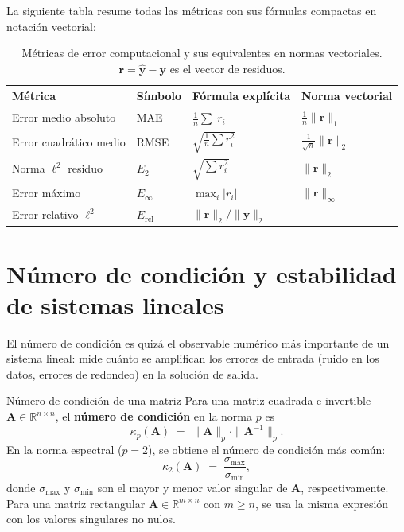 La siguiente tabla resume todas las métricas con sus fórmulas compactas en
notación vectorial:

\begin{table}[htbp]
\centering
\caption{Métricas de error computacional y sus equivalentes en normas vectoriales.
  $\mathbf{r} = \hat{\mathbf{y}} - \mathbf{y}$ es el vector de residuos.}
\label{tab:metricas}
\begin{tabular}{llll}
  \toprule
  \textbf{Métrica} & \textbf{Símbolo} & \textbf{Fórmula explícita}
    & \textbf{Norma vectorial} \\
  \midrule
  Error medio absoluto      & MAE        & $\tfrac{1}{n}\sum|r_i|$
    & $\tfrac{1}{n}\|\mathbf{r}\|_1$ \\[4pt]
  Error cuadrático medio    & RMSE       & $\sqrt{\tfrac{1}{n}\sum r_i^2}$
    & $\tfrac{1}{\sqrt{n}}\|\mathbf{r}\|_2$ \\[4pt]
  Norma $\ell^2$ residuo    & $E_2$      & $\sqrt{\sum r_i^2}$
    & $\|\mathbf{r}\|_2$ \\[4pt]
  Error máximo              & $E_\infty$ & $\max_i|r_i|$
    & $\|\mathbf{r}\|_\infty$ \\[4pt]
  Error relativo $\ell^2$   & $E_{\mathrm{rel}}$ &
    $\|\mathbf{r}\|_2 / \|\mathbf{y}\|_2$ & --- \\
  \bottomrule
\end{tabular}
\end{table}

\FloatBarrier

\section{Número de condición y estabilidad de sistemas lineales}
\label{ap:condicion}

El número de condición es quizá el observable numérico más importante de
un sistema lineal: mide cuánto se amplifican los errores de entrada (ruido
en los datos, errores de redondeo) en la solución de salida.

\begin{definicion}{Número de condición de una matriz}
\label{def:numero_condicion}
Para una matriz cuadrada e invertible $\mathbf{A} \in \mathbb{R}^{n \times n}$,
el \textbf{número de condición} en la norma $p$ es
\[
  \kappa_p(\mathbf{A}) \;=\; \|\mathbf{A}\|_p \cdot \|\mathbf{A}^{-1}\|_p.
\]
En la norma espectral ($p=2$), se obtiene el número de condición más común:
\[
  \kappa_2(\mathbf{A}) \;=\; \frac{\sigma_{\max}}{\sigma_{\min}},
\]
donde $\sigma_{\max}$ y $\sigma_{\min}$ son el mayor y menor valor singular de
$\mathbf{A}$, respectivamente. Para una matriz rectangular
$\mathbf{A} \in \mathbb{R}^{m \times n}$ con $m \geq n$, se usa la misma
expresión con los valores singulares no nulos.
\end{definicion}

